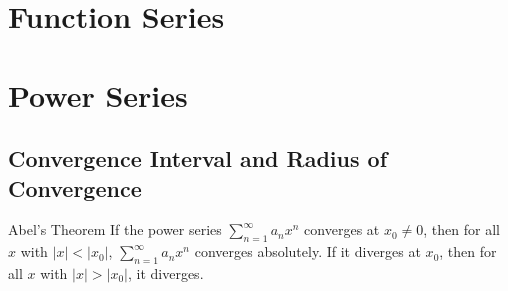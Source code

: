 \section{Function Series}

\section{Power Series}

\subsection{Convergence Interval and Radius of Convergence}

\begin{theorem}{Abel's Theorem}{}
  If the power series $\sum\limits_{n = 1}^{\infty} a_nx^n$
  converges at $x_0 \neq 0$,
  then for all $x$ with $|x| < |x_0|$,
  $\sum\limits_{n = 1}^{\infty} a_nx^n$ converges absolutely.
  If it diverges at $x_0$,
  then for all $x$ with $|x| > |x_0|$, it diverges.
\end{theorem}










